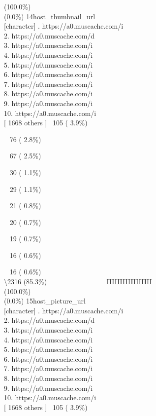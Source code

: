 \documentclass[
  journal,
]{IEEEtran}%
\begin{document}
(100.0\%) \\
(0.0\%) \textbar{} \textbar{} 14\textbar host\_thumbnail\_url\\
{[}character{]} . https://a0.muscache.com/i\\
2. https://a0.muscache.com/d\\
3. https://a0.muscache.com/i\\
4. https://a0.muscache.com/i\\
5. https://a0.muscache.com/i\\
6. https://a0.muscache.com/i\\
7. https://a0.muscache.com/i\\
8. https://a0.muscache.com/i\\
9. https://a0.muscache.com/i\\
10. https://a0.muscache.com/i\\
{[} 1668 others {]} \textbar~105 ( 3.9\%)\\
\strut ~ 76 ( 2.8\%)\\
\strut ~ 67 ( 2.5\%)\\
\strut ~ 30 ( 1.1\%)\\
\strut ~ 29 ( 1.1\%)\\
\strut ~ 21 ( 0.8\%)\\
\strut ~ 20 ( 0.7\%)\\
\strut ~ 19 ( 0.7\%)\\
\strut ~ 16 ( 0.6\%)\\
\strut ~ 16 ( 0.6\%)\\
\textbackslash2316 (85.3\%) \textbar{} \textbar~ ~ ~ ~ ~ ~ ~ ~ ~ ~
IIIIIIIIIIIIIIIII \\
(100.0\%) \\
(0.0\%) \textbar{} \textbar{} 15\textbar host\_picture\_url\\
{[}character{]} . https://a0.muscache.com/i\\
2. https://a0.muscache.com/d\\
3. https://a0.muscache.com/i\\
4. https://a0.muscache.com/i\\
5. https://a0.muscache.com/i\\
6. https://a0.muscache.com/i\\
7. https://a0.muscache.com/i\\
8. https://a0.muscache.com/i\\
9. https://a0.muscache.com/i\\
10. https://a0.muscache.com/i\\
{[} 1668 others {]} \textbar~105 ( 3.9\%)\\
\end{document}
